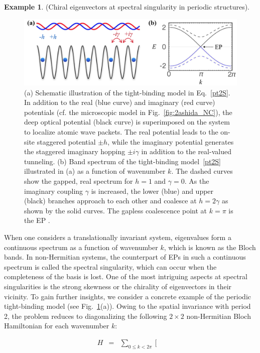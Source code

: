 \documentclass{tADP2e}
\theoremstyle{plain}
\newcommand{\eqn}[1]{
\begin{eqnarray}
	#1
\end{eqnarray}
}
\theoremstyle{plain}
\theoremstyle{definition}
\newtheorem{example}{Example}[section]
\newcommand{\exmp}[1]{
\begin{example}
	#1
\end{example}
}
\begin{document}
\exmp{\label{ptband}(Chiral eigenvectors at spectral singularity in periodic structures). 
\begin{figure}
\begin{center}
\includegraphics[width=12cm]{./Figures/fig_2_ep_chiral1.pdf}
\end{center}
\caption{(a) Schematic illustration of the tight-binding model in Eq.~\eqref{pt2S}.
In addition to the real (blue curve) and imaginary (red curve) potentials  (cf. the microscopic model in Fig.~\ref{fig:2ashida_NC}),  the deep optical potential (black curve) is superimposed on the system to localize atomic wave packets. The real potential leads to the on-site staggered potential $\pm h$, while the imaginary potential generates the staggered imaginary hopping $\pm i\gamma$ in addition to the real-valued tunneling. (b) Band spectrum of the tight-binding model~\eqref{pt2S} illustrated in (a) as a function of wavenumber $k$. The dashed curves show the gapped, real spectrum for $h=1$ and $\gamma=0$. As the imaginary coupling $\gamma$ is increased, the lower (blue) and upper (black) branches approach to each other and coalesce at $h=2\gamma$ as shown by the solid curves. The gapless coalescence point at $k=\pi$ is the EP \cite{YA18}.}
\label{fig:2epchiral1}
\end{figure}
When one considers a translationally invariant system, eigenvalues form a continuous spectrum as a function of wavenumber $k$, which is known as the Bloch bands. In non-Hermitian systems, the counterpart of EPs in such a continuous spectrum is called the spectral singularity, which can occur when the completeness of the basis is lost. One of the most intriguing aspects at spectral singularities is the strong skewness or the chirality  of eigenvectors in their vicinity. To gain further insights, we consider a concrete example of the periodic tight-binding model \cite{YA18} (see Fig.~\ref{fig:2epchiral1}(a)). Owing to the spatial invariance with period 2, the problem reduces to diagonalizing the following $2\times 2$ non-Hermitian Bloch Hamiltonian  for each wavenumber $k$:
 \eqn{
{H}\!&=&\!\!
\sum_{0\leq k<2\pi}\!\!\left[\begin{array}{cc}

\end{array}}}
\end{document}
